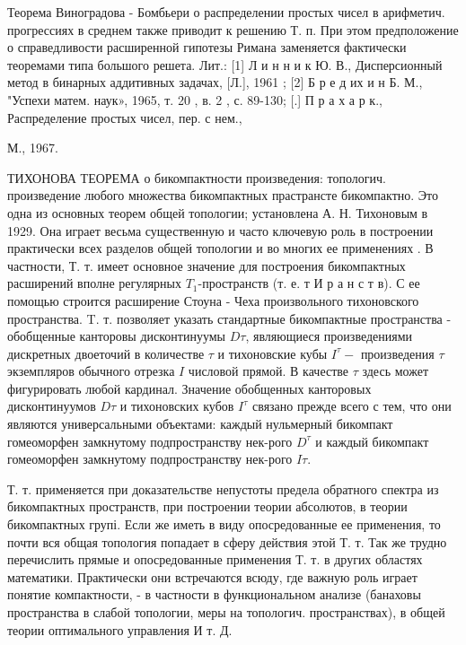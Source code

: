 \documentclass[10pt]{article}
\begin{document}
Теорема Виноградова - Бомбьери о распределении простых чисел в арифметич. прогрессиях в среднем также приводит к решению Т. п. При этом предположение о справедливости расширенной гипотезы Римана заменяется фактически теоремами типа большого решета. Лит.: [1] Л и н н и к Ю. В., Дисперсионный метод в бинарных аддитивных задачах, [Л.], 1961 ; [2] Б р е д их и н Б. М., "Успехи матем. наук», 1965, т. 20 , в. 2 , с. 89-130; [.] П р а х а р к., Распределение простых чисел, пер. с нем.,

М., 1967.



ТИХОНОВА ТЕОРЕМА о бикомпактности произведения: топологич. произведение любого множества бикомпактных прастрансте бикомпактно. Это одна из основных теорем общей топологии; установлена А. Н. Тихоновым в 1929. Она играет весьма существенную и часто ключевую роль в построении практически всех разделов общей топологии и во многих ее применениях . В частности, Т. т. имеет основное значение для построения бикомпактных расширений вполне регулярных $T_{1}$-пространств (т. е. т И р а н с т в). С ее помощью строится расширение Стоуна - Чеха произвольного тихоновского пространства. T. т. позволяет указать стандартные бикомпактные пространства - обобщенные канторовы дисконтинуумы $D \tau$, являющиеся произведениями дискретных двоеточий в количестве $\tau$ и тихоновские кубы $I^{\tau}-$ произведения $\tau$ экземпляров обычного отрезка $I$ числовой прямой. В качестве $\tau$ здесь может фигурировать любой кардинал. Значение обобщенных канторовых дисконтинуумов $D \tau$ и тихоновских кубов $I^{\tau}$ связано прежде всего с тем, что они являются универсальными объектами: каждый нульмерный бикомпакт гомеоморфен замкнутому подпространству нек-рого $D^{\tau}$ и каждый бикомпакт гомеоморфен замкнутому подпространству нек-рого $I \tau$.



Т. т. применяется при доказательстве непустоты предела обратного спектра из бикомпактных пространств, при построении теории абсолютов, в теории бикомпактных групі. Если же иметь в виду опосредованные ее применения, то почти вся общая топология попадает в сферу действия этой Т. т. Так же трудно перечислить прямые и опосредованные применения Т. т. в других областях математики. Практически они встречаются всюду, где важную роль играет понятие компактности, - в частности в функциональном анализе (банаховы пространства в слабой топологии, меры на топологич. пространствах), в общей теории оптимального управления И т. Д.
\end{document}
